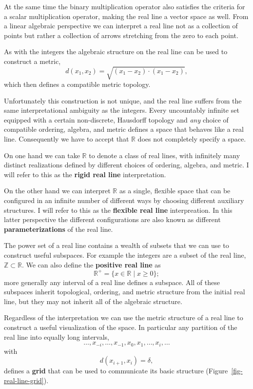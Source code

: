 \documentclass[
  letterpaper,
  DIV=11,
  numbers=noendperiod]{scrartcl}
\begin{document}
At the same time the binary multiplication operator also satisfies the
criteria for a scalar multiplication operator, making the real line a
vector space as well. From a linear algebraic perspective we can
interpret a real line not as a collection of points but rather a
collection of arrows stretching from the zero to each point.

As with the integers the algebraic structure on the real line can be
used to construct a metric, \[
d(x_{1}, x_{2}) = \sqrt{ (x_{1} - x_{2}) \cdot (x_{1} - x_{2}) },
\] which then defines a compatible metric topology.

Unfortunately this construction is not unique, and the real line suffers
from the same interpretational ambiguity as the integers. Every
uncountably infinite set equipped with a certain non-discrete, Hausdorff
topology and \emph{any} choice of compatible ordering, algebra, and
metric defines a space that behaves like a real line. Consequently we
have to accept that \(\mathbb{R}\) does not completely specify a space.

On one hand we can take \(\mathbb{R}\) to denote a class of real lines,
with infinitely many distinct realizations defined by different choices
of ordering, algebra, and metric. I will refer to this as the
\textbf{rigid real line} interpretation.

On the other hand we can interpret \(\mathbb{R}\) as a single, flexible
space that can be configured in an infinite number of different ways by
choosing different auxiliary structures. I will refer to this as the
\textbf{flexible real line} interpreation. In this latter perspective
the different configurations are also known as different
\textbf{parameterizations} of the real line.

The power set of a real line contains a wealth of subsets that we can
use to construct useful subspaces. For example the integers are a subset
of the real line, \(\mathbb{Z} \subset \mathbb{R}\). We can also define
the \textbf{positive real line} as \[
\mathbb{R}^{+} = \{ x \in \mathbb{R} \mid x \ge 0 \};
\] more generally any interval of a real line defines a subspace. All of
these subspaces inherit topological, ordering, and metric structure from
the initial real line, but they may not inherit all of the algebraic
structure.

Regardless of the interpretation we can use the metric structure of a
real line to construct a useful visualization of the space. In
particular any partition of the real line into equally long intervals,
\[
\ldots, x_{-i}, \ldots, x_{-1}, x_{0}, x_{1}, \ldots, x_{i}, \ldots
\] with \[
d(x_{i + 1}, x_{i}) = \delta,
\] defines a \textbf{grid} that can be used to communicate its basic
structure (Figure~\ref{fig-real-line-grid}).
\end{document}
